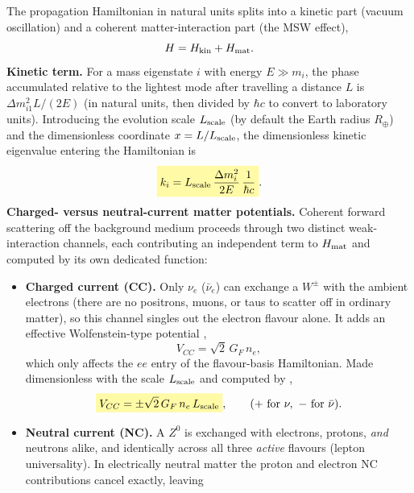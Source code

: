 \begin{theorybox}
The propagation Hamiltonian in natural units splits into a kinetic part
(vacuum oscillation) and a coherent matter-interaction part (the MSW
effect),
\begin{equation}
  H = H_{\rm kin} + H_{\rm mat}.
\end{equation}
\textbf{Kinetic term.} For a mass eigenstate $i$ with energy $E \gg m_i$, the
phase accumulated relative to the lightest mode after travelling a distance
$L$ is $\Delta m^2_{i1} L / (2E)$ (in natural units, then divided by
$\hbar c$ to convert to laboratory units). Introducing the evolution scale
$L_{\rm scale}$ (by default the Earth radius $R_\oplus$) and the
dimensionless coordinate $x=L/L_{\rm scale}$, the dimensionless kinetic
eigenvalue entering the Hamiltonian is
\begin{equation}
  \keyresult{k_i = L_{\rm scale}\,\frac{\Delta m^2_i}{2E}\,\frac{1}{\hbar c}}.
\end{equation}
\textbf{Charged- versus neutral-current matter potentials.} Coherent
forward scattering off the background medium proceeds through two distinct
weak-interaction channels, each contributing an independent term to
$H_{\rm mat}$ and computed by its own dedicated function:
\begin{itemize}
  \item \textbf{Charged current (CC).} Only $\nu_e$ ($\bar\nu_e$) can
    exchange a $W^\pm$ with the ambient electrons (there are no positrons,
    muons, or taus to scatter off in ordinary matter), so this channel
    singles out the electron flavour alone. It adds an effective
    Wolfenstein-type potential \parencite{Wolfenstein1978},
    \begin{equation}
      V_{CC} = \sqrt{2}\, G_F\, n_e,
    \end{equation}
    which only affects the $ee$ entry of the flavour-basis Hamiltonian.
    Made dimensionless with the scale $L_{\rm scale}$ and computed by
    ,
    \begin{equation}
      \keyresult{V_{CC} = \pm\sqrt{2}\,G_F\,n_e\,L_{\rm scale}}, \qquad (+\text{ for } \nu,\ -\text{ for } \bar\nu).
    \end{equation}
  \item \textbf{Neutral current (NC).} A $Z^0$ is exchanged with electrons,
    protons, \emph{and} neutrons alike, and identically across all three
    \emph{active} flavours (lepton universality). In electrically neutral
    matter the proton and electron NC contributions cancel exactly, leaving

\end{itemize}
\end{theorybox}
